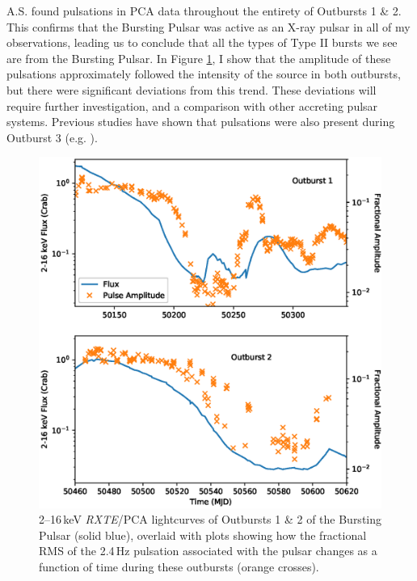 \par \textsf{A.S.} found pulsations in PCA data throughout the entirety of Outbursts 1 \& 2.  This confirms that the Bursting Pulsar was active as an X-ray pulsar in all of my observations, leading us to conclude that all the types of Type II bursts we see are from the Bursting Pulsar.  In Figure \ref{fig:pulsovertime}, I show that the amplitude of these pulsations approximately followed the intensity of the source in both outbursts, but there were significant deviations from this trend.  These deviations will require further investigation, and a comparison with other accreting pulsar systems.  Previous studies have shown that pulsations were also present during Outburst 3 (e.g. \citealp{Sanna_BP}).

\begin{figure}
  \centering
  \includegraphics[width=.9\linewidth, trim={0.4cm 1cm 0cm 1cm},clip]{images/PulseAmp.eps}
  \caption[\textit{RXTE}/PCA lightcurves of Outbursts 1 \& 2 of the Bursting Pulsar, overlaid with plots showing how the fractional RMS of the 2.4\,Hz pulsation changes as a function of time.]{\small 2--16\,keV \textit{RXTE}/PCA lightcurves of Outbursts 1 \& 2 of the Bursting Pulsar (solid blue), overlaid with plots showing how the fractional RMS of the 2.4\,Hz pulsation associated with the pulsar changes as a function of time during these outbursts (orange crosses).}
  \label{fig:pulsovertime}
\end{figure}


